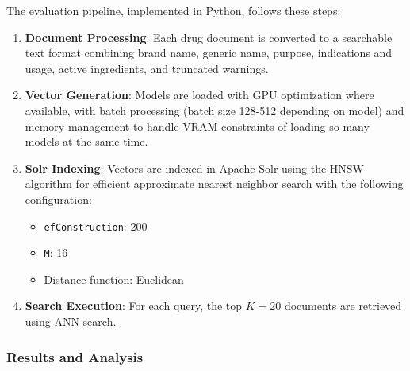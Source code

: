 The evaluation pipeline, implemented in Python, follows these steps:

\begin{enumerate}
    \item \textbf{Document Processing}: Each drug document is converted to a searchable text format combining brand name, generic name, purpose, indications and usage, active ingredients, and truncated warnings.

    \item \textbf{Vector Generation}: Models are loaded with GPU optimization where available, with batch processing (batch size 128-512 depending on model) and memory management to handle  VRAM constraints of loading so many models at the same time.

    \item \textbf{Solr Indexing}: Vectors are indexed in Apache Solr using the HNSW algorithm for efficient approximate nearest neighbor search with the following configuration:
          \begin{itemize}
              \item \texttt{efConstruction}: 200
              \item \texttt{M}: 16
              \item Distance function: Euclidean
          \end{itemize}

    \item \textbf{Search Execution}: For each query, the top $K=20$ documents are retrieved using ANN search.
\end{enumerate}

\subsubsection{Results and Analysis}
\label{subsubsec:phase1-results}

